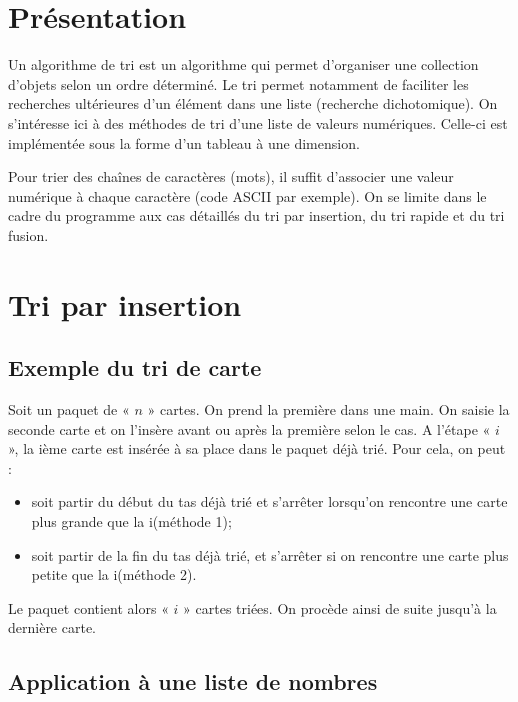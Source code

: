 \documentclass[10pt,fleqn]{article} %
\begin{document}


\section{Présentation}
Un algorithme de tri est un algorithme qui permet d'organiser une collection d'objets selon un ordre déterminé. Le tri permet notamment de faciliter les recherches ultérieures d'un élément dans une liste (recherche dichotomique).
On s'intéresse ici à des méthodes de tri d'une liste de valeurs numériques. Celle-ci est implémentée sous la forme d'un tableau à une dimension.

\begin{rem}
Pour trier des chaînes de caractères (mots), il suffit d'associer une valeur numérique à chaque caractère (code ASCII par exemple). 
On se limite dans le cadre du programme aux cas détaillés du tri par insertion, du tri rapide et du tri fusion.
\end{rem}

\section{Tri par insertion}
\subsection{Exemple du tri de carte}

Soit un paquet de « $n$ » cartes. On prend la première dans une main.
On saisie la seconde carte et on l'insère avant ou après la première selon le cas.
A l'étape « $i$ », la ième carte est insérée à sa place dans le paquet déjà trié. 
Pour cela, on peut :
\begin{itemize}
\item soit partir du début du tas déjà trié et s'arrêter lorsqu'on rencontre une carte plus grande que la i\ieme (méthode 1);
\item soit partir de la fin du tas déjà trié, et s'arrêter si on rencontre une carte plus petite que la i\ieme (méthode 2).
\end{itemize}
Le paquet contient alors « $i$ » cartes triées. On procède ainsi de suite jusqu'à la dernière carte.

\subsection{Application à une liste de nombres}
\end{document}
